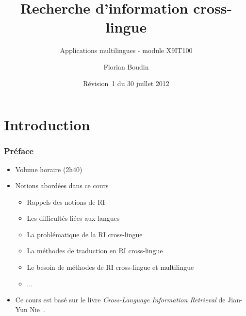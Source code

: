 \documentclass[12pt,aspectratio=43,dvipsnames,table]{beamer}
\title{Recherche d'information cross-lingue}
\subtitle{Applications multilingues - module X9IT100}
\author{Florian Boudin}
\institute{Département informatique, Université de Nantes}
\date[30 juillet 2013 / Rév.~1]{Révision~1 du 30 juillet 2012}
\begin{document}
\frame[plain]{\titlepage}


\section{Introduction}


\begin{frame}
    \frametitle{Préface}
    \begin{itemize} \itemsep10pt
        \item Volume horaire (2h40)
        \item Notions abordées dans ce cours
        \begin{itemize}
            \item Rappels des notions de RI
            \item Les difficultés liées aux langues
            \item La problématique de la RI cross-lingue
            \item La méthodes de traduction en RI cross-lingue
            \item Le besoin de méthodes de RI cross-lingue et multilingue
            \item ...
        \end{itemize}
        \item Ce cours est basé sur le livre \textit{Cross-Language Information 
              Retrieval} de Jian-Yun Nie~\cite{DBLP:series/synthesis/2010Nie}.
    \end{itemize}
\end{frame}
\end{document}
